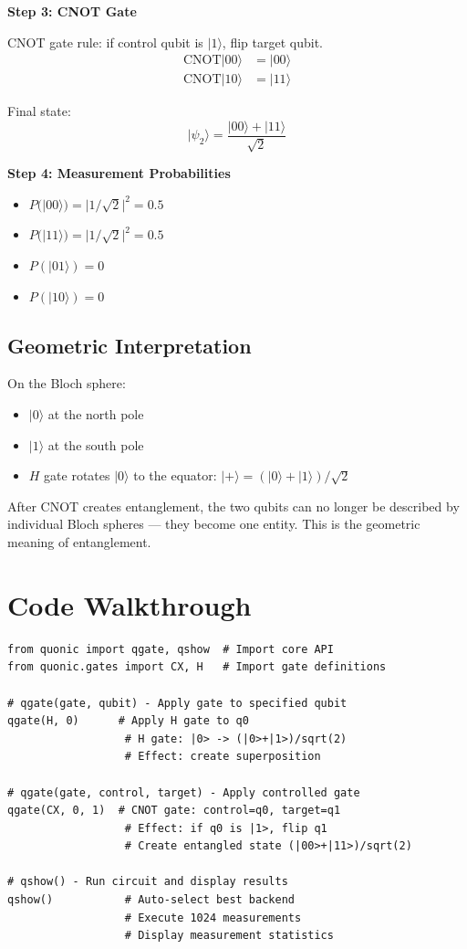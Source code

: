 \documentclass[12pt,a4paper]{article}
\begin{document}
\textbf{Step 3: CNOT Gate}

CNOT gate rule: if control qubit is $|1\rangle$, flip target qubit.
\begin{align}
\text{CNOT}|00\rangle &= |00\rangle \\
\text{CNOT}|10\rangle &= |11\rangle
\end{align}

Final state:
\begin{equation}
|\psi_2\rangle = \frac{|00\rangle + |11\rangle}{\sqrt{2}}
\end{equation}

\textbf{Step 4: Measurement Probabilities}

\begin{itemize}
  \item $P(|00\rangle) = |1/\sqrt{2}|^2 = 0.5$
  \item $P(|11\rangle) = |1/\sqrt{2}|^2 = 0.5$
  \item $P(|01\rangle) = 0$
  \item $P(|10\rangle) = 0$
\end{itemize}

\subsection{Geometric Interpretation}

On the Bloch sphere:
\begin{itemize}
  \item $|0\rangle$ at the north pole
  \item $|1\rangle$ at the south pole
  \item $H$ gate rotates $|0\rangle$ to the equator: $|+\rangle = (|0\rangle+|1\rangle)/\sqrt{2}$
\end{itemize}

After CNOT creates entanglement, the two qubits can no longer be described by individual Bloch spheres — they become one entity. This is the geometric meaning of entanglement.

\section{Code Walkthrough}

\begin{verbatim}
from quonic import qgate, qshow  # Import core API
from quonic.gates import CX, H   # Import gate definitions

# qgate(gate, qubit) - Apply gate to specified qubit
qgate(H, 0)      # Apply H gate to q0
                  # H gate: |0> -> (|0>+|1>)/sqrt(2)
                  # Effect: create superposition

# qgate(gate, control, target) - Apply controlled gate
qgate(CX, 0, 1)  # CNOT gate: control=q0, target=q1
                  # Effect: if q0 is |1>, flip q1
                  # Create entangled state (|00>+|11>)/sqrt(2)

# qshow() - Run circuit and display results
qshow()           # Auto-select best backend
                  # Execute 1024 measurements
                  # Display measurement statistics
\end{verbatim}
\end{document}
